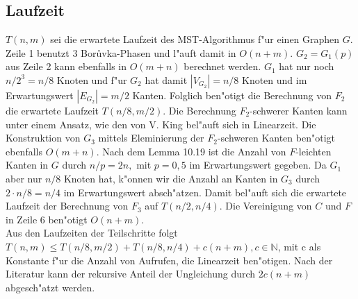 \subsection{Laufzeit}

$T(n,m)$ sei die erwartete Laufzeit des MST-Algorithmus f"ur einen Graphen $G$.
    Zeile 1 benutzt 3 Bor\r uvka-Phasen und  l"auft damit in $O(n+m)$. 
    $G_2 = G_1(p)$ aus Zeile 2 kann ebenfalls in $O(m + n)$ berechnet werden.
    $G_1$ hat nur noch $n/2^3 = n/8$ Knoten und f"ur $G_2$ hat damit 
    $|V_{G_2}| = n/8$ Knoten und im Erwartungswert $|E_{G_2}| = m/2$ Kanten.
    Folglich ben"otigt die Berechnung von $F_2$  die erwartete Laufzeit 
    $T(n/8,m/2)$.
    Die Berechnung $F_2$-schwerer Kanten kann 
    unter einem Ansatz, wie den von V. King \cite{simpleVer} bel"auft sich in Linearzeit.
    Die Konstruktion von $G_3$ mittels Eleminierung der $F_2$-schweren Kanten
    ben"otigt ebenfalls $O(m+n)$.
    Nach dem Lemma 10.19 \cite{randAlg} ist die Anzahl von $F$-leichten Kanten in $G$ durch
    $n/p = 2n,$ mit $p = 0,5$ im Erwartungswert gegeben. Da $G_1$
    aber nur $n/8$ Knoten hat, k"onnen wir die Anzahl an Kanten in $G_3$
    durch $2 \cdot n/8 = n/4$ im Erwartungswert absch"atzen.
    Damit bel"auft sich die erwartete Laufzeit der Berechnung von $F_3$ auf
    $T(n/2, n/4)$.
    Die Vereinigung von $C$ und $F$ in Zeile 6 ben"otigt $O(n+m)$.\\
Aus den Laufzeiten der Teilschritte folgt
    $T(n,m) \leq T(n/8, m/2) + T(n/8, n/4) + c(n+m), c \in \mathbb{N}$,
    mit c als Konstante f"ur die Anzahl von Aufrufen, die Linearzeit ben"otigen.
    Nach der Literatur kann der rekursive Anteil der Ungleichung durch $2c(n+m)$ 
    abgesch"atzt werden.
    \\
